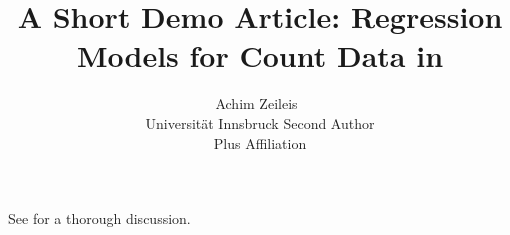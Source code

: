\documentclass[article]{jss}
\author{Achim Zeileis~\orcidlink{0000-0003-0918-3766}\\Universit\"at Innsbruck
   \And Second Author\\Plus Affiliation}
\title{A Short Demo Article: Regression Models for Count Data in \proglang{R}}
\begin{document}
See \cite{smith2020} for a thorough discussion.
\end{document}
